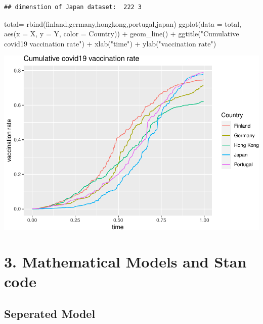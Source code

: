 \documentclass[
]{article}
\newenvironment{Shaded}{\begin{snugshade}}{\end{snugshade}}
\newcommand{\AttributeTok}[1]{\textcolor[rgb]{0.77,0.63,0.00}{#1}}
\newcommand{\FunctionTok}[1]{\textcolor[rgb]{0.00,0.00,0.00}{#1}}
\newcommand{\NormalTok}[1]{#1}
\newcommand{\OtherTok}[1]{\textcolor[rgb]{0.56,0.35,0.01}{#1}}
\newcommand{\SpecialCharTok}[1]{\textcolor[rgb]{0.00,0.00,0.00}{#1}}
\newcommand{\StringTok}[1]{\textcolor[rgb]{0.31,0.60,0.02}{#1}}
\begin{document}
\begin{verbatim}
## dimenstion of Japan dataset:  222 3
\end{verbatim}

\begin{Shaded}
\begin{Highlighting}[]
\NormalTok{total}\OtherTok{=} \FunctionTok{rbind}\NormalTok{(finland,germany,hongkong,portugal,japan)}
\FunctionTok{ggplot}\NormalTok{(}\AttributeTok{data =}\NormalTok{ total, }\FunctionTok{aes}\NormalTok{(}\AttributeTok{x =}\NormalTok{ X, }\AttributeTok{y =}\NormalTok{ Y, }\AttributeTok{color =}\NormalTok{ Country)) }\SpecialCharTok{+}
    \FunctionTok{geom\_line}\NormalTok{() }\SpecialCharTok{+}
    \FunctionTok{ggtitle}\NormalTok{(}\StringTok{"Cumulative covid19 vaccination rate"}\NormalTok{) }\SpecialCharTok{+}
    \FunctionTok{xlab}\NormalTok{(}\StringTok{"time"}\NormalTok{) }\SpecialCharTok{+} \FunctionTok{ylab}\NormalTok{(}\StringTok{"vaccination rate"}\NormalTok{)}
\end{Highlighting}
\end{Shaded}

\includegraphics{bda_project_files/figure-latex/unnamed-chunk-7-1.pdf}

\newpage

\hypertarget{mathematical-models-and-stan-code}{%
\section{3. Mathematical Models and Stan
code}\label{mathematical-models-and-stan-code}}

\hypertarget{seperated-model}{%
\subsection{Seperated Model}\label{seperated-model}}
\end{document}
